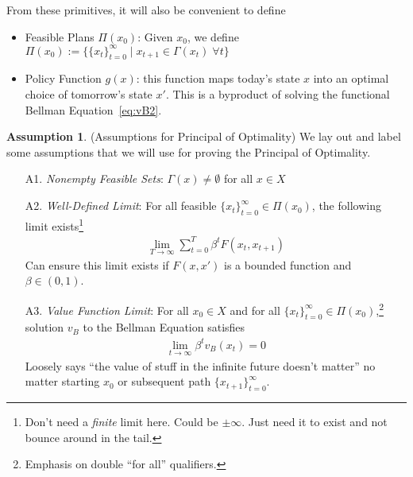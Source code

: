 \documentclass[12pt]{book}
\numberwithin{equation}{section} %
\theoremstyle{plain}
\theoremstyle{definition}
\newtheorem{assump}[thm]{Assumption}
\theoremstyle{remark}
\newcommand{\tinfz}{_{t=0}^\infty}
\begin{document}
From these primitives, it will also be convenient to define
\begin{itemize}

  \item Feasible Plans $\Pi(x_0)$:
    Given $x_0$,
    we define
    $\Pi(x_0) :=
    \big\{ \{x_t\}\tinfz \;|\; x_{t+1} \in \Gamma(x_t) \; \forall t\big\}$

  \item Policy Function $g(x)$: this function maps today's state $x$
    into an optimal choice of tomorrow's state $x'$. This is a byproduct
    of solving the functional Bellman Equation~\ref{eq:vB2}.
\end{itemize}

\clearpage
\begin{assump}(Assumptions for Principal of Optimality)
We lay out and label some assumptions that we will use for proving the
Principal of Optimality.
\begin{enumerate}
  \item[A1.] \emph{Nonempty Feasible Sets}:
    $\Gamma(x)\neq\emptyset$ for all $x\in X$

  \item[A2.] \emph{Well-Defined Limit}:
    For all feasible $\{x_{t}\}_{t=0}^\infty \in \Pi(x_0)$,
    the following limit exists\footnote{%
      Don't need a \emph{finite} limit here. Could be $\pm \infty$. Just
      need it to exist and not bounce around in the tail.
    }
    \begin{align*}
      \lim_{T\rightarrow\infty} \sum_{t=0}^T \beta^t F(x_t,x_{t+1})
    \end{align*}
    Can ensure this limit exists if $F(x,x')$ is a bounded function and
    $\beta \in (0,1)$.

  \item[A3.] \emph{Value Function Limit}:
    For all $x_0\in X$ and for all
    $\{x_{t}\}_{t=0}^\infty \in \Pi(x_0)$,\footnote{%
      Emphasis on double ``for all'' qualifiers.
    }
    solution $v_B$ to the Bellman Equation satisfies
    \begin{align*}
      \lim_{t\rightarrow\infty} \beta^t v_B(x_t) = 0
    \end{align*}
    Loosely says ``the value of stuff in the infinite future doesn't
    matter'' no matter starting $x_0$ or subsequent path
    $\{x_{t+1}\}_{t=0}^\infty$.
\end{enumerate}
\end{assump}
\end{document}

